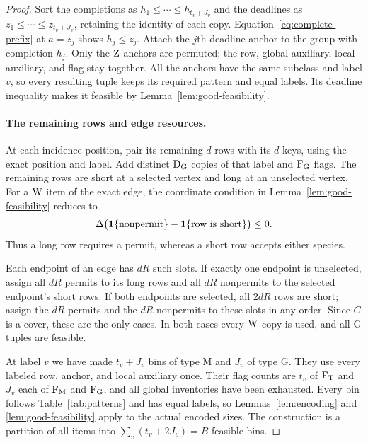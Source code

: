 \begin{proof}
Sort the completions as $h_1\le\cdots\le h_{t_v+J_v}$ and the
deadlines as $z_1\le\cdots\le z_{t_v+J_v}$, retaining the identity
of each copy.  Equation~\eqref{eq:complete-prefix} at $a=z_j$
shows $h_j\le z_j$.  Attach the $j$th deadline anchor to the group
with completion $h_j$.
Only the $\mathrm{Z}$ anchors are permuted; the row, global auxiliary,
local auxiliary, and flag stay together.  All the anchors have the
same subclass and label $v$, so every resulting tuple keeps its
required pattern and equal labels.  Its deadline inequality makes
it feasible by Lemma~\ref{lem:good-feasibility}.

\paragraph{The remaining rows and edge resources.}
At each incidence position, pair its remaining $d$ rows with its
$d$ keys, using the exact position and label.  Add distinct $\mathrm{D}_{\mathrm G}$
copies of that label and $\mathrm{F}_{\mathrm G}$ flags.  The remaining rows are short
at a selected vertex and long at an unselected vertex.
For a $\mathrm{W}$ item of the exact edge, the coordinate condition in
Lemma~\ref{lem:good-feasibility} reduces to
\begin{equation}\label{eq:exact-edge-completeness}
 \Delta\bigl(\mathbf{1}\{\text{nonpermit}\}
                 -\mathbf{1}\{\text{row is short}\}\bigr)\le0.
\end{equation}
Thus a long row requires a permit, whereas a short row accepts
either species.

Each endpoint of an edge has $dR$ such slots.  If exactly one
endpoint is unselected, assign all $dR$ permits to its long rows
and all $dR$ nonpermits to the selected endpoint's short rows.
If both endpoints are selected, all $2dR$ rows are short; assign
the $dR$ permits and the $dR$ nonpermits to these slots in any order.
Since $C$ is a cover, these are the only cases.  In both cases
every $\mathrm{W}$ copy is used, and all $\mathrm G$ tuples are feasible.

At label $v$ we have made $t_v+J_v$ bins of type $\mathrm M$ and
$J_v$ of type $\mathrm G$.  They use every labeled row, anchor,
and local auxiliary once.  Their flag counts are $t_v$ of $\mathrm{F}_{\mathrm T}$
and $J_v$ each of $\mathrm{F}_{\mathrm M}$ and $\mathrm{F}_{\mathrm G}$, and all global inventories have
been exhausted.  Every bin follows Table~\ref{tab:patterns} and
has equal labels, so Lemmas~\ref{lem:encoding} and
\ref{lem:good-feasibility} apply to the actual encoded sizes.
The construction is a partition of all items into
$\sum_v(t_v+2J_v)=B$ feasible bins.
\end{proof}

